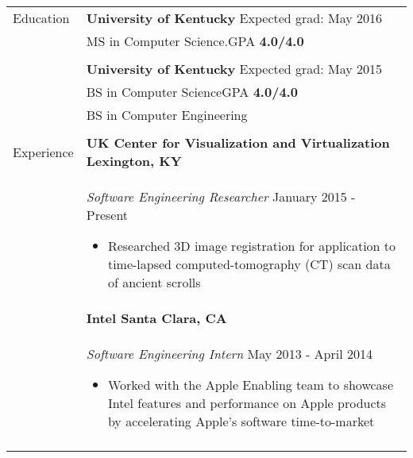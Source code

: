 \documentclass[11pt]{article}
\begin{document}
\begin{tabular}{p{1.0in} p{5.16in}}

    {Education} &

        \textbf{University of Kentucky} \hfill Expected grad: May 2016\vspace{0.015in} \\ &
        MS in Computer Science.\hfill GPA \textbf{4.0/4.0} \vspace{0.015in} \\ & \\ &

        \textbf{University of Kentucky} \hfill Expected grad: May 2015\vspace{0.015in} \\ &
        BS in Computer Science\hfill GPA \textbf{4.0/4.0} \vspace{0.015in} \\ &
        BS in Computer Engineering \\ \\

    {Experience} &
        \textbf{UK Center for Visualization and Virtualization \hfill Lexington, KY}\vspace{0.015in} \\ &
        {\textit{Software Engineering Researcher} \hfill January 2015 - Present}\vspace{0.015in}
        \begin{itemize}
            \renewcommand{\labelitemi}{$\diamond$}
            \item Researched 3D image registration for application to time-lapsed computed-tomography (CT) scan data of ancient scrolls
        \end{itemize} \\ &


        \textbf{Intel \hfill Santa Clara, CA}\vspace{0.015in} \\ &
        {\textit{Software Engineering Intern} \hfill May 2013 - April 2014}\vspace{0.015in}
        \begin{itemize}
            \renewcommand{\labelitemi}{$\diamond$}
            \item Worked with the Apple Enabling team to showcase Intel features and performance on Apple products by accelerating Apple’s software time-to-market
        \end{itemize} \\ &


\end{tabular}
\end{document}
